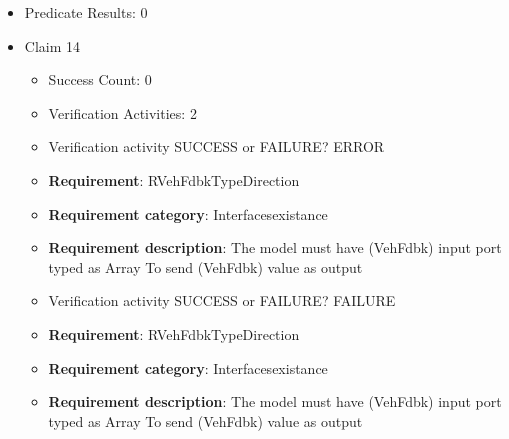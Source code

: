 \documentclass{article}
\begin{document}
\begin{itemize}
\begin{itemize}
						\item \textbf{Requirement}: RPoseTypeDirection 
						\item \textbf{Requirement category}: Interfacesexistance 
						\item \textbf{Requirement description}: The model must have (Pose) input port typed as BusVehiclePose To get (Pose) value as input
					
					\item Verification activity SUCCESS or FAILURE? SUCCESS
		
						\item \textbf{Requirement}: RPoseTypeDirection 
						\item \textbf{Requirement category}: Interfacesexistance 
						\item \textbf{Requirement description}: The model must have (Pose) input port typed as BusVehiclePose To get (Pose) value as input
					
				\end{itemize}
				
									    
				\item Predicate Results: 0

  				  \item Claim 14
				\begin{itemize}
			    	\item Success Count: 0 
			    	\item Verification Activities: 2
					\item Verification activity SUCCESS or FAILURE? ERROR
		
						\item \textbf{Requirement}: RVehFdbkTypeDirection 
						\item \textbf{Requirement category}: Interfacesexistance 
						\item \textbf{Requirement description}: The model must have (VehFdbk) input port typed as Array To send (VehFdbk) value as output
					
					\item Verification activity SUCCESS or FAILURE? FAILURE
		
						\item \textbf{Requirement}: RVehFdbkTypeDirection 
						\item \textbf{Requirement category}: Interfacesexistance 
						\item \textbf{Requirement description}: The model must have (VehFdbk) input port typed as Array To send (VehFdbk) value as output
					

\end{itemize}
\end{itemize}
\end{document}
